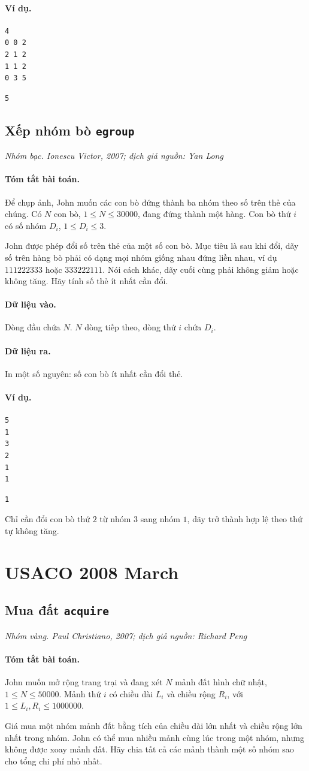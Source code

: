 \documentclass[11pt]{article}
\newcommand{\problem}[4]{%
  \subsection[#1 (#2)]{#1 \hfill {\normalsize\texttt{#2}}}%
  \noindent\textit{#3. #4}\par\smallskip
}
\newcommand{\iosec}[1]{\paragraph{#1}}
\begin{document}
\iosec{Ví dụ.}
\begin{verbatim}
4
0 0 2
2 1 2
1 1 2
0 3 5
\end{verbatim}

\begin{verbatim}
5
\end{verbatim}

\problem{Xếp nhóm bò}{egroup}{Nhóm bạc}{Ionescu Victor, 2007; dịch giả nguồn: Yan Long}

\iosec{Tóm tắt bài toán.}
Để chụp ảnh, John muốn các con bò đứng thành ba nhóm theo số trên thẻ của
chúng. Có \(N\) con bò, \(1\le N\le 30000\), đang đứng thành một hàng. Con bò
thứ \(i\) có số nhóm \(D_i\), \(1\le D_i\le 3\).

John được phép đổi số trên thẻ của một số con bò. Mục tiêu là sau khi đổi,
dãy số trên hàng bò phải có dạng mọi nhóm giống nhau đứng liền nhau, ví dụ
\(111222333\) hoặc \(333222111\). Nói cách khác, dãy cuối cùng phải không
giảm hoặc không tăng. Hãy tính số thẻ ít nhất cần đổi.

\iosec{Dữ liệu vào.}
Dòng đầu chứa \(N\). \(N\) dòng tiếp theo, dòng thứ \(i\) chứa \(D_i\).

\iosec{Dữ liệu ra.}
In một số nguyên: số con bò ít nhất cần đổi thẻ.

\iosec{Ví dụ.}
\begin{verbatim}
5
1
3
2
1
1
\end{verbatim}

\begin{verbatim}
1
\end{verbatim}

Chỉ cần đổi con bò thứ \(2\) từ nhóm \(3\) sang nhóm \(1\), dãy trở thành hợp
lệ theo thứ tự không tăng.

\section{USACO 2008 March}

\problem{Mua đất}{acquire}{Nhóm vàng}{Paul Christiano, 2007; dịch giả nguồn: Richard Peng}

\iosec{Tóm tắt bài toán.}
John muốn mở rộng trang trại và đang xét \(N\) mảnh đất hình chữ nhật,
\(1\le N\le 50000\). Mảnh thứ \(i\) có chiều dài \(L_i\) và chiều rộng
\(R_i\), với \(1\le L_i,R_i\le 1000000\).

Giá mua một nhóm mảnh đất bằng tích của chiều dài lớn nhất và chiều rộng lớn
nhất trong nhóm. John có thể mua nhiều mảnh cùng lúc trong một nhóm, nhưng
không được xoay mảnh đất. Hãy chia tất cả các mảnh thành một số nhóm sao cho
tổng chi phí nhỏ nhất.
\end{document}
